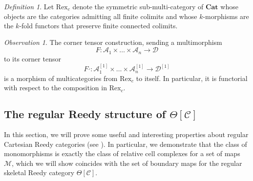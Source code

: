 \documentclass[leqno]{article}
\numberwithin{equation}{subsection}
\theoremstyle{plain}   %
\theoremstyle{remark}
\newtheorem{obs}[equation]{Observation}
\newtheorem{defn}[equation]{Definition}
\theoremstyle{plain}
\newcommand{\Cat}{\ensuremath{\mathbf{Cat}}}
\providecommand{\C}{}
\renewcommand{\C}{\ensuremath{\mathcal{C}}}
\begin{document}
\begin{defn} Let \(\mathrm{Rex}_c\) denote the symmetric sub-multi-category of \(\Cat\) whose objects are the categories admitting all finite colimits and whose \(k\)-morphisms are the \(k\)-fold functors that preserve finite connected colimits.
\end{defn}
\begin{obs}\label{cornertensorfunctoriality} The corner tensor construction, sending a multimorphism 
	\[F:\mathcal{A}_1\times\dots\times \mathcal{A}_n \to \mathcal{D}\] to its corner tensor
	\[F^\lrcorner:\mathcal{A}_1^{[1]}\times\dots\times \mathcal{A}_n^{[1]} \to \mathcal{D}^{[1]}\] is a morphism of multicategories from \(\mathrm{Rex}_c\) to itself.  In particular, it is functorial with respect to the composition in \(\mathrm{Rex}_c\).
\end{obs}
\subsection{The regular Reedy structure of \(\Theta[\C]\)}\label{reedy}
In this section, we will prove some useful and interesting properties about regular Cartesian Reedy categories (see ). In particular, we demonstrate that the class of monomorphisms is exactly the class of relative cell complexes for a set of maps \(\mathscr{M}\), which we will show coincides with the set of boundary maps for the regular skeletal Reedy category \(\Theta[\C]\).  
\end{document}
